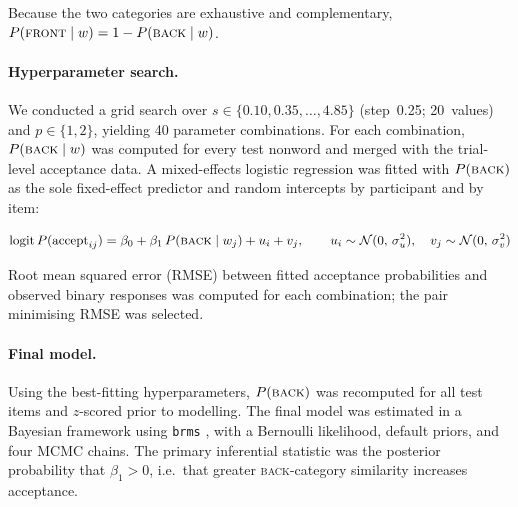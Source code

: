 Because the two categories are exhaustive and complementary, \(P(\textsc{front} \mid w) = 1 - P(\textsc{back} \mid w)\).

\paragraph{Hyperparameter search.}
We conducted a grid search over \(s \in \{0.10, 0.35, \ldots, 4.85\}\) (step~0.25; 20~values) and \(p \in \{1, 2\}\), yielding 40 parameter combinations. For each combination, \(P(\textsc{back} \mid w)\) was computed for every test nonword and merged with the trial-level acceptance data. A mixed-effects logistic regression was fitted with \(P(\textsc{back})\) as the sole fixed-effect predictor and random intercepts by participant and by item:

\begin{equation}
  \operatorname{logit} P(\mathrm{accept}_{ij})
    = \beta_0 + \beta_1\,P(\textsc{back} \mid w_j) + u_i + v_j,
  \qquad
  u_i \sim \mathcal{N}(0,\,\sigma_u^2),\quad v_j \sim \mathcal{N}(0,\,\sigma_v^2)
  \label{eq:gcm-search}
\end{equation}

Root mean squared error (RMSE) between fitted acceptance probabilities and observed binary responses was computed for each combination; the pair minimising RMSE was selected.

\paragraph{Final model.}
Using the best-fitting hyperparameters, \(P(\textsc{back})\) was recomputed for all test items and $z$-scored prior to modelling. The final model was estimated in a Bayesian framework using \texttt{brms} \citep{burkner2017}, with a Bernoulli likelihood, default priors, and four MCMC chains. The primary inferential statistic was the posterior probability that $\beta_1 > 0$, i.e.\ that greater \textsc{back}-category similarity increases acceptance.
